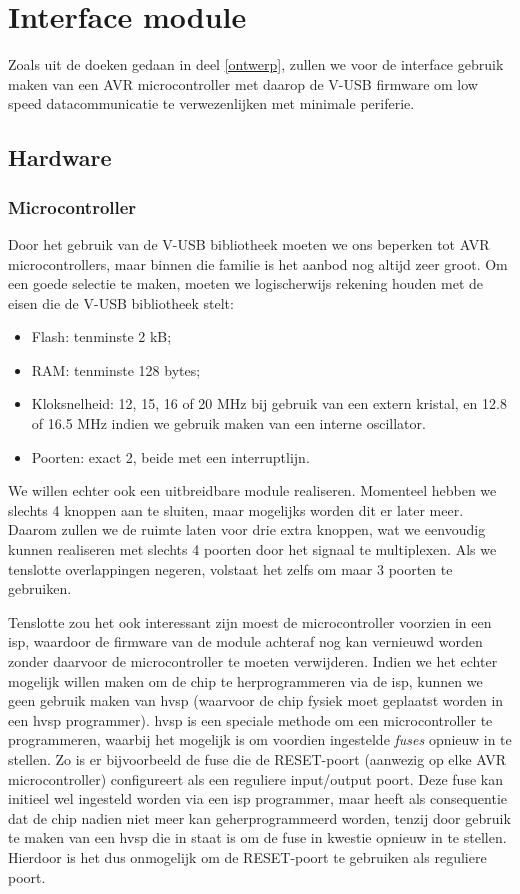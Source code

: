 \part{Interface module}
\label{interface}

Zoals uit de doeken gedaan in deel \ref{ontwerp}, zullen we voor de interface gebruik maken van een AVR microcontroller met daarop de V-USB firmware om low speed datacommunicatie te verwezenlijken met minimale periferie.

\chapter{Hardware}

\section{Microcontroller}

Door het gebruik van de V-USB bibliotheek moeten we ons beperken tot AVR microcontrollers, maar binnen die familie is het aanbod nog altijd zeer groot. Om een goede selectie te maken, moeten we logischerwijs rekening houden met de eisen die de V-USB bibliotheek stelt:
\begin{itemize}
\item Flash: tenminste 2 kB;
\item RAM: tenminste 128 bytes;
\item Kloksnelheid: 12, 15, 16 of 20 MHz bij gebruik van een extern kristal, en 12.8 of 16.5 MHz indien we gebruik maken van een interne oscillator.
\item Poorten: exact 2, beide met een interruptlijn.
\end{itemize}

We willen echter ook een uitbreidbare module realiseren. Momenteel hebben we slechts 4 knoppen aan te sluiten, maar mogelijks worden dit er later meer. Daarom zullen we de ruimte laten voor drie extra knoppen, wat we eenvoudig kunnen realiseren met slechts 4 poorten door het signaal te multiplexen. Als we tenslotte overlappingen negeren, volstaat het zelfs om maar 3 poorten te gebruiken.

Tenslotte zou het ook interessant zijn moest de microcontroller voorzien in een \ac{isp}, waardoor de firmware van de module achteraf nog kan vernieuwd worden zonder daarvoor de microcontroller te moeten verwijderen. Indien we het echter mogelijk willen maken om de chip te herprogrammeren via de \ac{isp}, kunnen we geen gebruik maken van \ac{hvsp} (waarvoor de chip fysiek moet geplaatst worden in een \ac{hvsp} programmer). \ac{hvsp} is een speciale methode om een microcontroller te programmeren, waarbij het mogelijk is om voordien ingestelde \emph{fuses} opnieuw in te stellen. Zo is er bijvoorbeeld de fuse die de RESET-poort (aanwezig op elke AVR microcontroller) configureert als een reguliere input/output poort. Deze fuse kan initieel wel ingesteld worden via een \ac{isp} programmer, maar heeft als consequentie dat de chip nadien niet meer kan geherprogrammeerd worden, tenzij door gebruik te maken van een \ac{hvsp} die in staat is om de fuse in kwestie opnieuw in te stellen. Hierdoor is het dus onmogelijk om de RESET-poort te gebruiken als reguliere poort.

